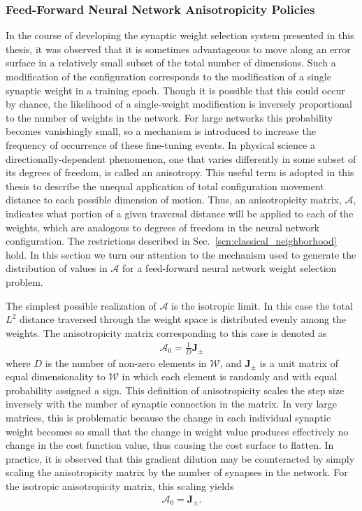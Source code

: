 \documentclass[11pt]{afthesis}
\begin{document}
	\subsubsection{Feed-Forward Neural Network Anisotropicity Policies}
	\label{scn:ffnn_anisotropicity}
	In the course of developing the synaptic weight selection system presented in this thesis, it was observed that it is sometimes advantageous to move along an error surface in a relatively small subset of the total number of dimensions. Such a modification of the configuration corresponds to the modification of a single synaptic weight in a training epoch. Though it is possible that this could occur by chance, the likelihood of a single-weight modification is inversely proportional to the number of weights in the network. For large networks this probability becomes vanishingly small, so a mechanism is introduced to increase the frequency of occurrence of these fine-tuning events. In physical science a directionally-dependent phenomenon, one that varies differently in some subset of its degrees of freedom, is called an anisotropy. This useful term is adopted in this thesis to describe the unequal application of total configuration movement distance to each possible dimension of motion. Thus, an anisotropicity matrix, $\boldsymbol{\mathcal{A}}$,  indicates what portion of a given traversal distance will be applied to each of the weights, which are analogous to degrees of freedom in the neural network configuration. The restrictions described in Sec.~\ref{scn:classical_neighborhood} hold. In this section we turn our attention to the mechanism used to generate the distribution of values in $\boldsymbol{\mathcal{A}}$ for a feed-forward neural network weight selection problem. 
	
	The simplest possible realization of $\boldsymbol{\mathcal{A}}$ is the isotropic limit. In this case the total $L^2$ distance traversed through the weight space is distributed evenly among the weights. The anisotropicity matrix corresponding to this case is denoted as
	\begin{align}\label{eq:isotropic_anisotropicity}
	\boldsymbol{\mathcal{A}}_0 = \frac{1}{D}  \boldsymbol{J}_{\pm}
	\end{align}
	\noindent where $D$ is the number of non-zero elements in $\boldsymbol{\mathcal{W}}$, and $\boldsymbol{J}_{\pm}$ is a unit matrix of equal dimensionality to $\boldsymbol{\mathcal{W}}$ in which each element is randomly and with equal probability assigned a sign. This definition of anisotropicity scales the step size inversely with the number of synaptic connection in the matrix. In very large matrices, this is problematic because the change in each individual synaptic weight becomes so small that the change in weight value produces effectively no change in the cost function value, thus causing the cost surface to flatten. In practice, it is observed that this gradient dilution may be counteracted by simply scaling the anisotropicity matrix by the number of synapses in the network. For the isotropic anisotropicity matrix, this scaling yields
	\begin{align}\label{eq:isotropic_anisotropicity_scaled}
	\boldsymbol{\mathcal{A}}_0 =  \boldsymbol{J}_{\pm}.
	\end{align} 
	
\end{document}
